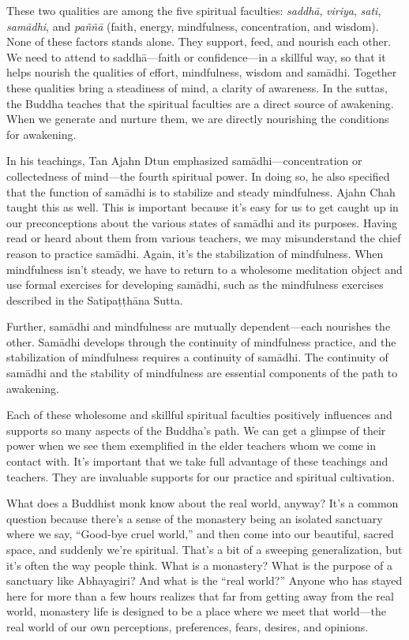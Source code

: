 These two qualities are among the five spiritual faculties: 
\emph{saddhā}, \emph{viriya}, \emph{sati}, \emph{samādhi}, and 
\emph{paññā} (faith, energy, mindfulness, concentration, and 
wisdom). None of these factors stands alone. They support, feed, and 
nourish each other. We need to attend to saddhā---faith or 
confidence---in a skillful way, so that it helps nourish the qualities 
of effort, mindfulness, wisdom and samādhi. Together these qualities 
bring a steadiness of mind, a clarity of awareness. In the suttas, the 
Buddha teaches that the spiritual faculties are a direct source of 
awakening. When we generate and nurture them, we are directly 
nourishing the conditions for awakening.

In his teachings, Tan Ajahn Dtun emphasized samādhi---concentration or 
collectedness of mind---the fourth spiritual power. In doing so, he 
also specified that the function of samādhi is to stabilize and steady 
mindfulness. Ajahn Chah taught this as well. This is important because 
it's easy for us to get caught up in our preconceptions about the 
various states of samādhi and its purposes. Having read or heard about 
them from various teachers, we may misunderstand the chief reason to 
practice samādhi. Again, it's the stabilization of mindfulness. When 
mindfulness isn't steady, we have to return to a wholesome meditation 
object and use formal exercises for developing samādhi, such as the 
mindfulness exercises described in the Satipaṭṭhāna Sutta.

Further, samādhi and mindfulness are mutually dependent---each 
nourishes the other. Samādhi develops through the continuity of 
mindfulness practice, and the stabilization of mindfulness requires a 
continuity of samādhi. The continuity of samādhi and the stability of 
mindfulness are essential components of the path to awakening.

Each of these wholesome and skillful spiritual faculties positively 
influences and supports so many aspects of the Buddha's path. We can 
get a glimpse of their power when we see them exemplified in the elder 
teachers whom we come in contact with. It's important that we take full 
advantage of these teachings and teachers. They are invaluable supports 
for our practice and spiritual cultivation.


What does a Buddhist monk know about the real world, anyway? It's a 
common question because there's a sense of the monastery being an 
isolated sanctuary where we say, ``Good-bye cruel world,'' and then 
come into our beautiful, sacred space, and suddenly we're spiritual. 
That's a bit of a sweeping generalization, but it's often the way 
people think. What is a monastery? What is the purpose of a sanctuary 
like Abhayagiri? And what is the ``real world?'' Anyone who has stayed 
here for more than a few hours realizes that far from getting away from 
the real world, monastery life is designed to be a place where we meet 
that world---the real world of our own perceptions, preferences, fears, 
desires, and opinions.

